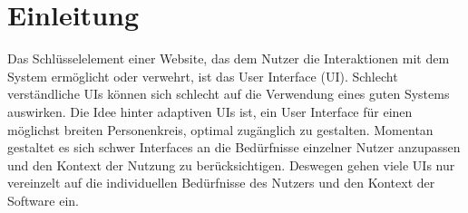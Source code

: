 \chapter{Einleitung}
Das Schlüsselelement einer Website, das dem Nutzer die Interaktionen mit dem System ermöglicht oder verwehrt, ist das User Interface (UI).
Schlecht verständliche UIs können sich schlecht auf die Verwendung eines guten Systems auswirken. \cite[S.30]{Am-dUI}
Die Idee hinter adaptiven UIs ist, ein User Interface für einen möglichst breiten Personenkreis, optimal zugänglich zu gestalten.
Momentan gestaltet es sich schwer Interfaces an die Bedürfnisse einzelner Nutzer anzupassen und den Kontext der Nutzung zu berücksichtigen.
Deswegen gehen viele UIs nur vereinzelt auf die individuellen Bedürfnisse des Nutzers und den Kontext der Software ein.


